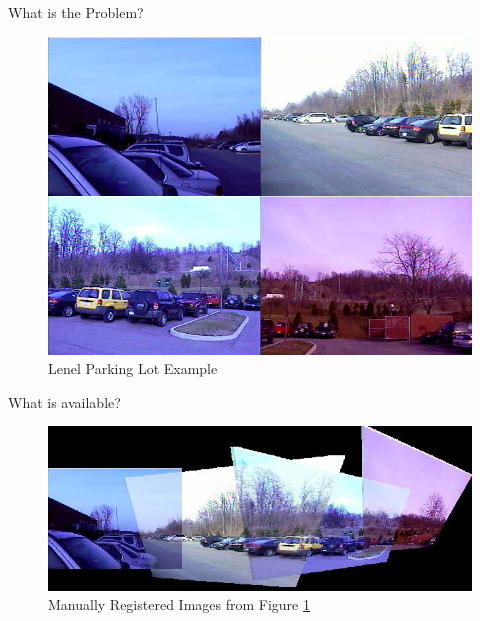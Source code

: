 \documentclass{beamer}
\begin{document}
\begin{frame}[c]{\sc What is the Problem?}

\begin{center}

\begin{figure}[!h]
\centering
\includegraphics[width=.8\columnwidth]{LenelExample}
\caption{Lenel Parking Lot Example}
\label{LenelExample}
\end{figure}

\end{center}

\end{frame}



\begin{frame}[t]{\sc What is available?}

\begin{center}

\begin{figure}[!h]
\centering
\vfill
\includegraphics[width=1\columnwidth]{LenelExampleStitched}
\caption{Manually Registered Images from Figure \ref{LenelExample}}
\label{LenelExampleStitched}
\end{figure}

\end{center}

\end{frame}
\end{document}
